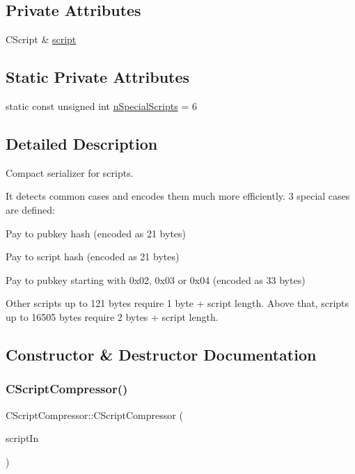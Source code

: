 \subsection*{Private Attributes}
\begin{DoxyCompactItemize}
\item 
C\+Script \& \mbox{\hyperlink{class_c_script_compressor_afb1c3fb4b9ff4870501705c030cef056}{script}}
\end{DoxyCompactItemize}
\subsection*{Static Private Attributes}
\begin{DoxyCompactItemize}
\item 
static const unsigned int \mbox{\hyperlink{class_c_script_compressor_a3f0dc2a613a667745ee24a476ce21337}{n\+Special\+Scripts}} = 6
\end{DoxyCompactItemize}


\subsection{Detailed Description}
Compact serializer for scripts.

It detects common cases and encodes them much more efficiently. 3 special cases are defined\+:
\begin{DoxyItemize}
\item Pay to pubkey hash (encoded as 21 bytes)
\item Pay to script hash (encoded as 21 bytes)
\item Pay to pubkey starting with 0x02, 0x03 or 0x04 (encoded as 33 bytes)
\end{DoxyItemize}

Other scripts up to 121 bytes require 1 byte + script length. Above that, scripts up to 16505 bytes require 2 bytes + script length. 

\subsection{Constructor \& Destructor Documentation}
\mbox{\label{class_c_script_compressor_aad31afe3d14387b163b5c043e834ca2b}} 
\subsubsection{\texorpdfstring{C\+Script\+Compressor()}{CScriptCompressor()}}
{\footnotesize\ttfamily C\+Script\+Compressor\+::\+C\+Script\+Compressor (\begin{DoxyParamCaption}\item[{C\+Script \&}]{script\+In }\end{DoxyParamCaption})\hspace{0.3cm}{\ttfamily [inline]}}



